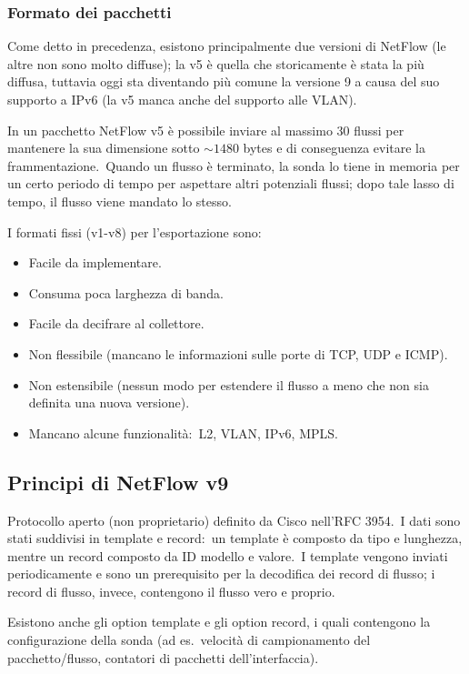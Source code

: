 \subsubsection{Formato dei pacchetti}

Come detto in precedenza, esistono principalmente due versioni di NetFlow (le altre non sono molto diffuse); la v5 è quella che storicamente è stata la più diffusa, tuttavia oggi sta diventando più comune la versione 9 a causa del suo supporto a IPv6 (la v5 manca anche del supporto alle VLAN).\

In un pacchetto NetFlow v5 è possibile inviare al massimo 30 flussi per mantenere la sua dimensione sotto $\sim 1480$ bytes e di conseguenza evitare la frammentazione.\
Quando un flusso è terminato, la sonda lo tiene in memoria per un certo periodo di tempo per aspettare altri potenziali flussi; dopo tale lasso di tempo, il flusso viene mandato lo stesso.

I formati fissi (v1-v8) per l'esportazione sono:
\begin{itemize}
    \item Facile da implementare.
    \item Consuma poca larghezza di banda.
    \item Facile da decifrare al collettore.
    \item Non flessibile (mancano le informazioni sulle porte di TCP, UDP e ICMP).
    \item Non estensibile (nessun modo per estendere il flusso a meno che non sia definita una nuova versione).
    \item Mancano alcune funzionalità:\ L2, VLAN, IPv6, MPLS.
\end{itemize}

\subsection{Principi di NetFlow v9}

Protocollo aperto (non proprietario) definito da Cisco nell'RFC 3954.\
I dati sono stati suddivisi in template e record:\ un template è composto da tipo e lunghezza, mentre un record composto da ID modello e valore.\
I template vengono inviati periodicamente e sono un prerequisito per la decodifica dei record di flusso; i record di flusso, invece, contengono il flusso vero e proprio.\

Esistono anche gli option template e gli option record, i quali contengono la configurazione della sonda (ad es.\ velocità di campionamento del pacchetto/flusso, contatori di pacchetti dell'interfaccia).\

